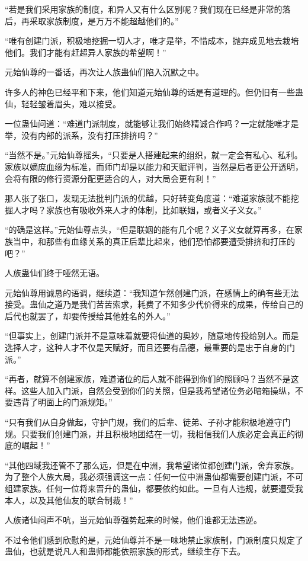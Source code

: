 \begin{this_body}
“若是我们采用家族的制度，和异人又有什么区别呢？我们现在已经是非常的落后，再采取家族制度，是万万不能超越他们的。”

“唯有创建门派，积极地挖掘一切人才，唯才是举，不惜成本，抛弃成见地去栽培他们。我们才能有赶超异人家族的希望啊！”

元始仙尊的一番话，再次让人族蛊仙们陷入沉默之中。

许多人的神色已经平和下来，他们知道元始仙尊的话是有道理的。但仍旧有一些蛊仙，轻轻皱着眉头，难以接受。

一位蛊仙问道：“难道门派制度，就能够让我们始终精诚合作吗？一定就能唯才是举，没有内部的派系，没有打压排挤吗？”

“当然不是。”元始仙尊摇头，“只要是人搭建起来的组织，就一定会有私心、私利。家族以嫡庶血缘为标准，而师门却是以能力和天赋评判，当然是后者更公开透明，会将有限的修行资源分配更适合的人，对大局会更有利！”

那人张了张口，发现无法批判门派的优越，只好转变角度道：“难道家族就不能挖掘人才吗？家族也有吸收外来人才的体制，比如联姻，或者义子义女。”

“的确是这样。”元始仙尊点头，“但是联姻的能有几个呢？义子义女就算再多，在家族当中，和那些有血缘关系的真正后辈比起来，他们恐怕都要遭受排挤和打压的吧？”

人族蛊仙们终于哑然无语。

元始仙尊用诚恳的语调，继续道：“我知道乍然创建门派，在感情上的确有些无法接受。蛊仙之道乃是我们苦苦索求，耗费了不知多少代价得来的成果，传给自己的后代也就罢了，却要传授给其他姓名的外人。”

“但事实上，创建门派并不是意味着就要将仙道的奥妙，随意地传授给别人。而是选择人才，这种人才不仅是天赋好，而且还要有品德，最重要的是忠于自身的门派。”

“再者，就算不创建家族，难道诸位的后人就不能得到你们的照顾吗？当然不是这样。这些人加入门派，自然会受到你们的关照，但是我希望诸位务必暗箱操纵，不要违背了明面上的门派规矩。”

“只有我们从自身做起，守护门规，我们的后辈、徒弟、子孙才能积极地遵守门规。只要我们创建门派，并且积极地团结在一切，我相信我们人族必定会真正的彻底的崛起！”

“其他四域我还管不了那么远，但是在中洲，我希望诸位都创建门派，舍弃家族。为了整个人族大局，我必须强调这一点：任何一位中洲蛊仙都需要创建门派，不可组建家族。任何一位将来晋升的蛊仙，都要依约如此。一旦有人违规，就要遭受我本人，以及其他仙友的联合制裁！”

人族诸仙闷声不吭，当元始仙尊强势起来的时候，他们谁都无法违逆。

不过令他们感到欣慰的是，元始仙尊并不是一味地禁止家族制，门派制度只规定了蛊仙，也就是说凡人和蛊师都能依照家族的形式，继续生存下去。


\end{this_body}
